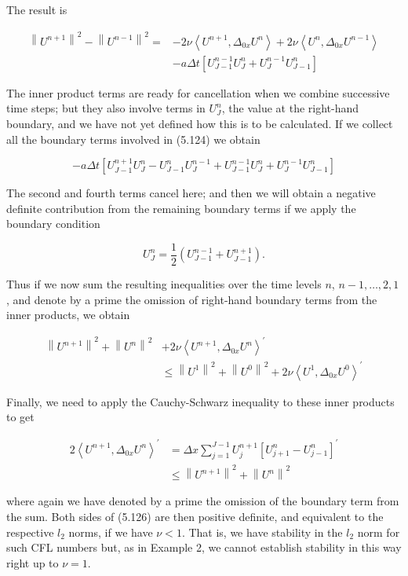 \documentclass[10pt]{article}
\begin{document}
The result is

\[
\begin{aligned}
\left\|U^{n+1}\right\|^{2}-\left\|U^{n-1}\right\|^{2}= & -2 \nu\left\langle U^{n+1}, \Delta_{0 x} U^{n}\right\rangle+2 \nu\left\langle U^{n}, \Delta_{0 x} U^{n-1}\right\rangle \\
& -a \Delta t\left[U_{J-1}^{n-1} U_{J}^{n}+U_{J}^{n-1} U_{J-1}^{n}\right]
\end{aligned}
\]

The inner product terms are ready for cancellation when we combine successive time steps; but they also involve terms in \(U_{J}^{n}\), the value at the right-hand boundary, and we have not yet defined how this is to be calculated. If we collect all the boundary terms involved in (5.124) we obtain

\[
-a \Delta t\left[U_{J-1}^{n+1} U_{J}^{n}-U_{J-1}^{n} U_{J}^{n-1}+U_{J-1}^{n-1} U_{J}^{n}+U_{J}^{n-1} U_{J-1}^{n}\right]
\]

The second and fourth terms cancel here; and then we will obtain a negative definite contribution from the remaining boundary terms if we apply the boundary condition

\[
U_{J}^{n}=\frac{1}{2}\left(U_{J-1}^{n-1}+U_{J-1}^{n+1}\right) .
\]

Thus if we now sum the resulting inequalities over the time levels \(n\), \(n-1, \ldots, 2,1\), and denote by a prime the omission of right-hand boundary terms from the inner products, we obtain

\[
\begin{aligned}
\left\|U^{n+1}\right\|^{2}+\left\|U^{n}\right\|^{2} & +2 \nu\left\langle U^{n+1}, \Delta_{0 x} U^{n}\right\rangle^{\prime} \\
& \leq\left\|U^{1}\right\|^{2}+\left\|U^{0}\right\|^{2}+2 \nu\left\langle U^{1}, \Delta_{0 x} U^{0}\right\rangle^{\prime}
\end{aligned}
\]

Finally, we need to apply the Cauchy-Schwarz inequality to these inner products to get

\[
\begin{aligned}
2\left\langle U^{n+1}, \Delta_{0 x} U^{n}\right\rangle^{\prime} & =\Delta x \sum_{j=1}^{J-1} U_{j}^{n+1}\left[U_{j+1}^{n}-U_{j-1}^{n}\right]^{\prime} \\
& \leq\left\|U^{n+1}\right\|^{2}+\left\|U^{n}\right\|^{2}
\end{aligned}
\]

where again we have denoted by a prime the omission of the boundary term from the sum. Both sides of (5.126) are then positive definite, and equivalent to the respective \(l_{2}\) norms, if we have \(\nu<1\). That is, we have stability in the \(l_{2}\) norm for such CFL numbers but, as in Example 2, we cannot establish stability in this way right up to \(\nu=1\).
\end{document}
